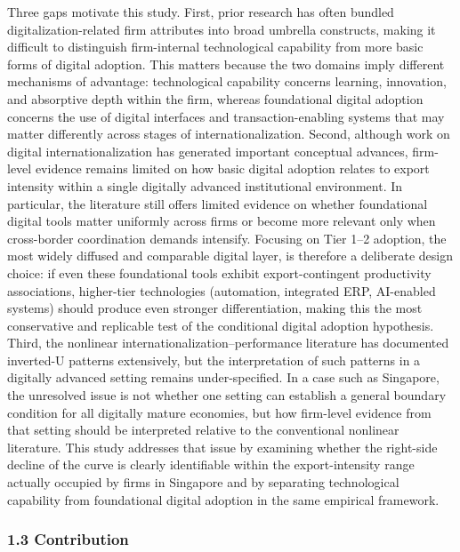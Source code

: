 \documentclass[12pt,a4paper]{article}
\begin{document}
Three gaps motivate this study. First, prior research has often bundled
digitalization-related firm attributes into broad umbrella constructs,
making it difficult to distinguish firm-internal technological
capability from more basic forms of digital adoption. This matters
because the two domains imply different mechanisms of advantage:
technological capability concerns learning, innovation, and absorptive
depth within the firm, whereas foundational digital adoption concerns
the use of digital interfaces and transaction-enabling systems that may
matter differently across stages of internationalization. Second,
although work on digital internationalization has generated important
conceptual advances, firm-level evidence remains limited on how basic
digital adoption relates to export intensity within a single digitally
advanced institutional environment. In particular, the literature still
offers limited evidence on whether foundational digital tools matter
uniformly across firms or become more relevant only when cross-border
coordination demands intensify. Focusing on Tier 1--2 adoption, the most
widely diffused and comparable digital layer, is therefore a deliberate
design choice: if even these foundational tools exhibit
export-contingent productivity associations, higher-tier technologies
(automation, integrated ERP, AI-enabled systems) should produce even
stronger differentiation, making this the most conservative and
replicable test of the conditional digital adoption hypothesis. Third,
the nonlinear internationalization--performance literature has
documented inverted-U patterns extensively, but the interpretation of
such patterns in a digitally advanced setting remains under-specified.
In a case such as Singapore, the unresolved issue is not whether one
setting can establish a general boundary condition for all digitally
mature economies, but how firm-level evidence from that setting should
be interpreted relative to the conventional nonlinear literature. This
study addresses that issue by examining whether the right-side decline
of the curve is clearly identifiable within the export-intensity range
actually occupied by firms in Singapore and by separating technological
capability from foundational digital adoption in the same empirical
framework.

\hypertarget{13-contribution}{%
\subsubsection{1.3 Contribution}\label{13-contribution}}
\end{document}
